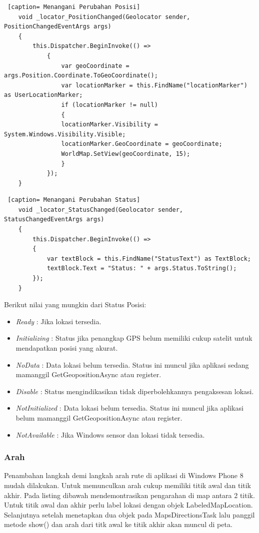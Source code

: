 \begin{lstlisting} [caption= Menangani Perubahan Posisi]
	void _locator_PositionChanged(Geolocator sender, PositionChangedEventArgs args)
	{
		this.Dispatcher.BeginInvoke(() =>
			{
				var geoCoordinate = args.Position.Coordinate.ToGeoCoordinate();
				var locationMarker = this.FindName("locationMarker") as UserLocationMarker;
				if (locationMarker != null)
				{
				locationMarker.Visibility = System.Windows.Visibility.Visible;
				locationMarker.GeoCoordinate = geoCoordinate;
				WorldMap.SetView(geoCoordinate, 15);
				}
			});
	}
\end{lstlisting}

\begin{lstlisting} [caption= Menangani Perubahan Status]
	void _locator_StatusChanged(Geolocator sender, StatusChangedEventArgs args)
	{
		this.Dispatcher.BeginInvoke(() =>
		{
			var textBlock = this.FindName("StatusText") as TextBlock;
			textBlock.Text = "Status: " + args.Status.ToString();
		});
	}
\end{lstlisting}

Berikut nilai yang mungkin dari Status Posisi:
\begin{itemize}
	\item \textit{Ready} : Jika lokasi tersedia.
	\item \textit{Initializing} : Status jika penangkap GPS belum memiliki cukup satelit untuk mendapatkan posisi yang akurat. 
	\item \textit{NoData} : Data lokasi belum tersedia. Status ini muncul jika aplikasi sedang mamanggil GetGeopositionAsync atau register.
	\item \textit{Disable} : Status mengindikasikan tidak diperbolehkannya pengaksesan lokasi.
	\item \textit{NotInitialized} : Data lokasi belum tersedia. Status ini muncul jika aplikasi belum mamanggil GetGeopositionAsync atau register.
	\item \textit{NotAvailable} : Jika Windows sensor dan lokasi tidak tersedia.
\end{itemize}

\subsubsection{Arah}
\label{subsubsec:Arah}
\hspace{0.5cm} Penambahan langkah demi langkah arah rute di aplikasi di Windows Phone 8 mudah dilakukan. Untuk memunculkan arah cukup memiliki titik awal dan titik akhir. Pada listing dibawah mendemontrasikan pengarahan di map antara 2 titik. Untuk titik awal dan akhir perlu label lokasi dengan objek LabeledMapLocation. Selanjutnya setelah menetapkan dua objek pada MapsDirectionsTask lalu panggil metode show() dan arah dari titk awal ke titik akhir akan muncul di peta.    

